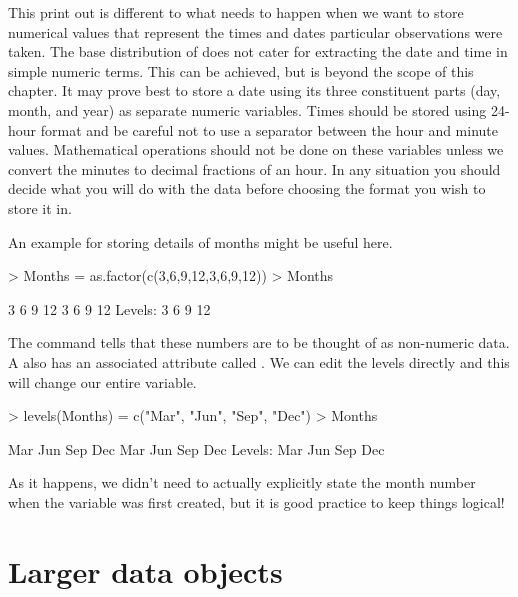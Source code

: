 This print out is different to what needs to happen when we want to store numerical values that represent the times and dates particular observations were taken. The base distribution of \R{} does not cater for extracting the date and time in simple numeric terms. This can be achieved, but is beyond the scope of this chapter. It may prove best to store a date using its three constituent parts (day, month, and year) as separate numeric variables. Times should be stored using 24-hour format and be careful not to use a separator between the hour and minute values. Mathematical operations should not be done on these variables unless we convert the minutes to decimal fractions of an hour. In any situation you should decide what you will do with the data before choosing the format you wish to store it in. 
 
An example for storing details of months might be useful here. 
\begin{Schunk}
\begin{Sinput}
> Months = as.factor(c(3,6,9,12,3,6,9,12)) 
> Months 
\end{Sinput}
\begin{Soutput}
[1] 3  6  9  12 3  6  9  12
Levels: 3 6 9 12
\end{Soutput}
\end{Schunk}
The  command tells \R{} that these numbers are to be thought of as non-numeric data. A  also has an associated attribute called . We can edit the levels directly and this will change our entire variable. \label{UseOfLevels} 
\begin{Schunk}
\begin{Sinput}
> levels(Months) = c("Mar", "Jun", "Sep", "Dec") 
> Months 
\end{Sinput}
\begin{Soutput}
[1] Mar Jun Sep Dec Mar Jun Sep Dec
Levels: Mar Jun Sep Dec
\end{Soutput}
\end{Schunk}
As it happens, we didn't need to actually explicitly state the month number when the variable was first created, but it is good practice to keep things logical! 
 
\section{Larger data objects} 
 
